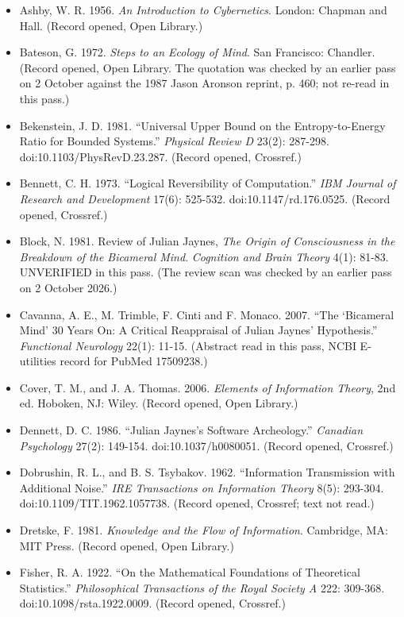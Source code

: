\documentclass[11pt]{article}
\begin{document}
\begin{itemize}
\item Ashby, W. R. 1956. \emph{An Introduction to Cybernetics}. London: Chapman and Hall. (Record opened, Open Library.)
\item Bateson, G. 1972. \emph{Steps to an Ecology of Mind}. San Francisco: Chandler. (Record opened, Open Library. The quotation was checked by an earlier pass on 2 October against the 1987 Jason Aronson reprint, p. 460; not re-read in this pass.)
\item Bekenstein, J. D. 1981. ``Universal Upper Bound on the Entropy-to-Energy Ratio for Bounded Systems.'' \emph{Physical Review D} 23(2): 287-298. doi:10.1103/\allowbreak{}PhysRevD.23.287. (Record opened, Crossref.)
\item Bennett, C. H. 1973. ``Logical Reversibility of Computation.'' \emph{IBM Journal of Research and Development} 17(6): 525-532. doi:10.1147/\allowbreak{}rd.176.0525. (Record opened, Crossref.)
\item Block, N. 1981. Review of Julian Jaynes, \emph{The Origin of Consciousness in the Breakdown of the Bicameral Mind}. \emph{Cognition and Brain Theory} 4(1): 81-83. UNVERIFIED in this pass. (The review scan was checked by an earlier pass on 2 October 2026.)
\item Cavanna, A. E., M. Trimble, F. Cinti and F. Monaco. 2007. ``The `Bicameral Mind' 30 Years On: A Critical Reappraisal of Julian Jaynes' Hypothesis.'' \emph{Functional Neurology} 22(1): 11-15. (Abstract read in this pass, NCBI E-utilities record for PubMed 17509238.)
\item Cover, T. M., and J. A. Thomas. 2006. \emph{Elements of Information Theory}, 2nd ed. Hoboken, NJ: Wiley. (Record opened, Open Library.)
\item Dennett, D. C. 1986. ``Julian Jaynes's Software Archeology.'' \emph{Canadian Psychology} 27(2): 149-154. doi:10.1037/\allowbreak{}h0080051. (Record opened, Crossref.)
\item Dobrushin, R. L., and B. S. Tsybakov. 1962. ``Information Transmission with Additional Noise.'' \emph{IRE Transactions on Information Theory} 8(5): 293-304. doi:10.1109/\allowbreak{}TIT.1962.1057738. (Record opened, Crossref; text not read.)
\item Dretske, F. 1981. \emph{Knowledge and the Flow of Information}. Cambridge, MA: MIT Press. (Record opened, Open Library.)
\item Fisher, R. A. 1922. ``On the Mathematical Foundations of Theoretical Statistics.'' \emph{Philosophical Transactions of the Royal Society A} 222: 309-368. doi:10.1098/\allowbreak{}rsta.1922.0009. (Record opened, Crossref.)

\end{itemize}
\end{document}
